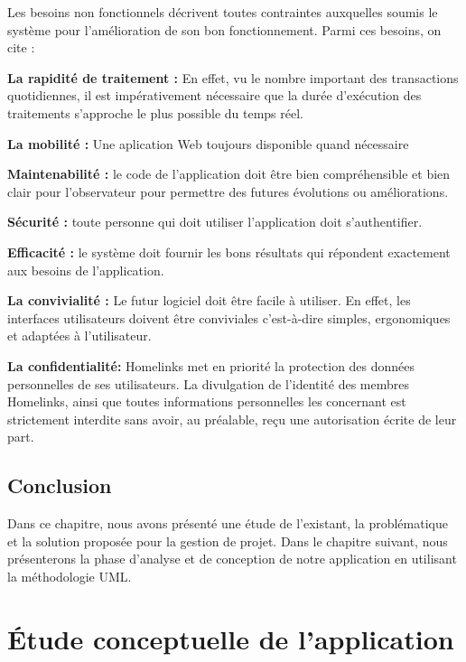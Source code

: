 \documentclass[a4paper,10pt]{book}
\begin{document}
\par 
Les besoins non fonctionnels décrivent toutes contraintes auxquelles soumis le système pour l’amélioration de son bon fonctionnement. Parmi ces besoins, on cite :
\\
\par\textbf{La rapidité de traitement :} En effet, vu le nombre important des transactions quotidiennes, il est impérativement nécessaire que la durée d'exécution des traitements s'approche le plus possible du temps réel.
\par\textbf{La mobilité :} Une aplication Web toujours disponible quand  nécessaire  
\par\textbf{Maintenabilité :} le code de l’application doit être bien compréhensible et bien clair pour l’observateur  pour permettre des futures évolutions ou améliorations.

\par\textbf{Sécurité :} toute personne qui doit utiliser l’application doit s’authentifier.

\par\textbf{Efficacité :} le système doit fournir les bons résultats qui répondent exactement aux besoins de l’application.
\par\textbf{La convivialité :} Le futur logiciel doit être facile à utiliser. En effet, les interfaces utilisateurs doivent être conviviales c'est-à-dire simples, ergonomiques et adaptées à l'utilisateur.

\par\textbf{La confidentialité:} Homelinks met en priorité la protection des données personnelles de ses utilisateurs. La divulgation de l’identité des membres Homelinks, ainsi que toutes informations personnelles les concernant est strictement interdite sans avoir, au préalable, reçu une autorisation écrite de leur part. 

\section{Conclusion}
\par   Dans ce chapitre, nous avons présenté une étude de l’existant, la problématique et la solution proposée pour la gestion de projet. Dans le chapitre suivant, nous présenterons la phase d’analyse et de conception de notre application en utilisant la méthodologie UML. 

\chapter{ Étude conceptuelle de l’application }
\end{document}
